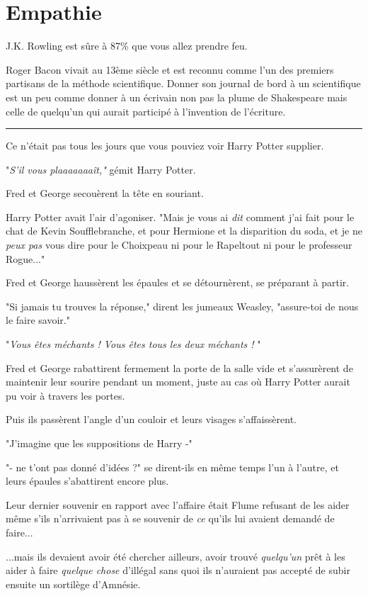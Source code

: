 
\chapter{Empathie}

J.K. Rowling est sûre à 87\% que vous allez prendre feu.

Roger Bacon vivait au 13ème siècle et est reconnu comme l'un des premiers partisans de la méthode scientifique. Donner son journal de bord à un scientifique est un peu comme donner à un écrivain non pas la plume de Shakespeare mais celle de quelqu'un qui aurait participé à l'invention de l'écriture.
\par\noindent\rule{\textwidth}{0.4pt}
Ce n'était pas tous les jours que vous pouviez voir Harry Potter supplier.

"\emph{S'il vous plaaaaaaaît," } gémit Harry Potter.

Fred et George secouèrent la tête en souriant.

Harry Potter avait l'air d'agoniser. "Mais je vous ai \emph{dit}  comment j'ai fait pour le chat de Kevin Soufflebranche, et pour Hermione et la disparition du soda, et je ne \emph{peux pas}  vous dire pour le Choixpeau ni pour le Rapeltout ni pour le professeur Rogue..."

Fred et George haussèrent les épaules et se détournèrent, se préparant à partir.

"Si jamais tu trouves la réponse," dirent les jumeaux Weasley, "assure-toi de nous le faire savoir."

"\emph{Vous êtes méchants ! Vous êtes tous les deux méchants !} "

Fred et George rabattirent fermement la porte de la salle vide et s'assurèrent de maintenir leur sourire pendant un moment, juste au cas où Harry Potter aurait pu voir à travers les portes.

Puis ils passèrent l'angle d'un couloir et leurs visages s'affaissèrent.

"J'imagine que les suppositions de Harry -"

"- ne t'ont pas donné d'idées ?" se dirent-ils en même temps l'un à l'autre, et leurs épaules s'abattirent encore plus.

Leur dernier souvenir en rapport avec l'affaire était Flume refusant de les aider même s'ils n'arrivaient pas à se souvenir de \emph{ce}  qu'ils lui avaient demandé de faire...

...mais ils devaient avoir été chercher ailleurs, avoir trouvé \emph{quelqu'un}  prêt à les aider à faire \emph{quelque chose}  d'illégal sans quoi ils n'auraient pas accepté de subir ensuite un sortilège d'Amnésie.

